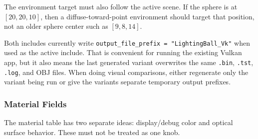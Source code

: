 The environment target must also follow the active scene.  If the sphere is at
\([20,20,10]\), then a diffuse-toward-point environment should target that
position, not an older sphere center such as \([9,8,14]\).

Both includes currently write \texttt{output\_file\_prefix =
"LightingBall\_Vk"} when used as the active include.  That is convenient for
running the existing Vulkan app, but it also means the last generated variant
overwrites the same \texttt{.bin}, \texttt{.tst}, \texttt{.log}, and OBJ
files.  When doing visual comparisons, either regenerate only the variant
being run or give the variants separate temporary output prefixes.

\subsubsection{Material Fields}

The material table has two separate ideas: display/debug color and optical
surface behavior.  These must not be treated as one knob.

